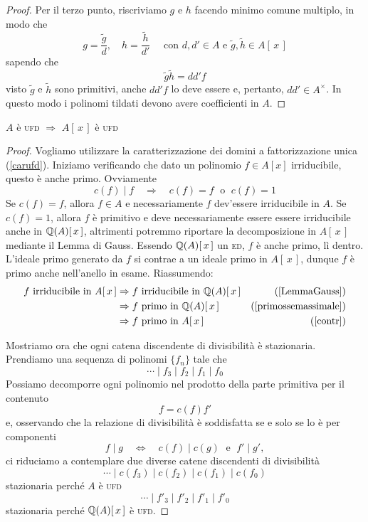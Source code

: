 \begin{multicols}{2}
\begin{proof}
	 Per il terzo punto, riscriviamo $ g $ e $ h $ facendo minimo comune multiplo, in modo che
	 \[ g = \frac{\tilde{g}}{d}, \quad h = \frac{\tilde{h}}{d'} \quad \text{ con } d, d' \in A \text{ e } \tilde{g}, \tilde{h} \in A[\,x\,]   \]
	 sapendo che
	 \[ \tilde{g}\tilde{h} = dd'f \]
	 visto $ \tilde{g} $ e $ \tilde{h} $ sono primitivi, anche $ dd'f $ lo deve essere e, pertanto, $ dd' \in A^{\times} $. In questo modo i polinomi tildati devono avere coefficienti in $ A $.
\end{proof}
\columnbreak
\begin{theorem}
	$ A $ è \textsc{ufd} $ \Rightarrow $ $ A[\,x\,] $ è \textsc{ufd}
\end{theorem}
\begin{proof}
	Vogliamo utilizzare la caratterizzazione dei domini a fattorizzazione unica (\ref{carufd}). 
	Iniziamo verificando che dato un polinomio $ f \in A[x] $ irriducibile, questo è anche primo. Ovviamente 
	\[ c(f) \mid f \quad\Rightarrow\quad c(f) = f \;\text{ o }\; c(f) = 1 \]
	Se $ c(f) = f $, allora $ f \in A $ e necessariamente $ f $ dev'essere irriducibile in $ A $.
	Se $ c(f) = 1 $, allora $ f $ è primitivo e deve necessariamente essere essere irriducibile anche in $ \mathbb{Q}(A)[\,x\,] $, altrimenti potremmo riportare la decomposizione in $ A[\,x\,] $ mediante il Lemma di Gauss.
	Essendo $ \mathbb{Q}(A)[\,x\,] $ un \textsc{ed}, $ f $ è anche primo, lì dentro. L'ideale primo generato da $ f $ si contrae a un ideale primo in $ A[\,x\,] $, dunque $ f $ è primo anche nell'anello in esame. Riassumendo:
	\begin{align*}
		f \text{ irriducibile in } A[\,x\,] & \Rightarrow f \text{ irriducibile in } \mathbb{Q}(A)[\,x\,] & (\ref{LemmaGauss}) \\
		& \Rightarrow f \text{ primo in } \mathbb{Q}(A)[\,x\,] & (\ref{primossemassimale}) \\
		& \Rightarrow f \text{ primo in } A[\,x\,] & (\ref{contr}) \\
	\end{align*}
	
	
	Mostriamo ora che ogni catena discendente di divisibilità è stazionaria. Prendiamo una sequenza di polinomi $ \{ f_n \} $ tale che
	\[ \cdots \mid f_3 \mid f_2 \mid f_1 \mid f_0 \]
	Possiamo decomporre ogni polinomio nel prodotto della parte primitiva per il contenuto
	\[ f = c(f)f' \]
	e, osservando che la relazione di divisibilità è soddisfatta se e solo se lo è per componenti
	\[ f \mid g \quad\Leftrightarrow\quad c(f) \mid c(g) \;\text{ e }\; f' \mid g', \]
	ci riduciamo a contemplare due diverse catene discendenti di divisibilità
	\[ \cdots \mid c(f_3) \mid c(f_2) \mid c(f_1) \mid c(f_0) \]
	stazionaria perché  $ A $ è \textsc{ufd}
	\[ \cdots \mid f'_3 \mid f'_2 \mid f'_1 \mid f'_0 \]
	stazionaria perché  $ \mathbb{Q}(A)[\,x\,] $ è \textsc{ufd}.
\end{proof}




\end{multicols}
